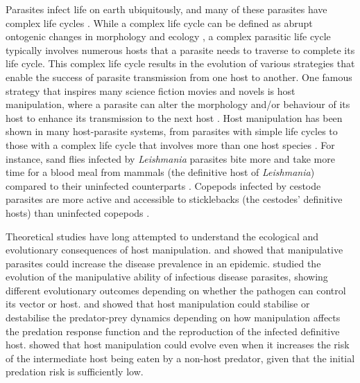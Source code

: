 \documentclass[a4paper]{scrartcl}
\begin{document}
Parasites infect life on earth ubiquitously, and many of these parasites have complex life cycles \citep{zimmer:book:2001}. 
While a complex life cycle can be defined as abrupt ontogenic changes in morphology and ecology \citep{Benesh:2016dj}, a complex parasitic life cycle typically involves numerous hosts that a parasite needs to traverse to complete its life cycle. 
This complex life cycle results in the evolution of various strategies that enable the success of parasite transmission from one host to another. 
One famous strategy that inspires many science fiction movies and novels is host manipulation, where a parasite can alter the morphology and/or behaviour of its  host to enhance its transmission to the next host \citep{Hughes2012}. 
Host manipulation has been shown in many host-parasite systems, from parasites with simple life cycles to those with a complex life cycle that involves more than one host species \citep{Hughes2012,molyneux_jefferies1986}. 
For instance, sand flies infected by \textit{Leishmania} parasites bite more and take more time for a blood meal from mammals (the definitive host of \textit{Leishmania}) compared to their uninfected counterparts \citep{Rogers2007}. 
Copepods infected by cestode parasites are more active and accessible to sticklebacks (the cestodes' definitive hosts) than uninfected copepods \citep{Wedekind1996}.

Theoretical studies have long attempted to understand the ecological and evolutionary consequences of host manipulation. 
\cite{Roosien2013} and \cite{Hosack2008} showed that manipulative parasites could increase the disease prevalence in an epidemic. \cite{Gandon2018} studied the evolution of the manipulative ability of infectious disease parasites, showing different evolutionary outcomes depending on whether the pathogen can control its vector or host.
\cite{Hadeler1989, Fenton2006} and \cite{Rogawa2018} showed that host manipulation could stabilise or destabilise the predator-prey dynamics depending on how manipulation affects the predation response function and the reproduction of the infected definitive host. 
\cite{Seppl2008} showed that host manipulation could evolve even when it increases the risk of the intermediate host being eaten by a non-host predator, given that the initial predation risk is sufficiently low.  
\end{document}
